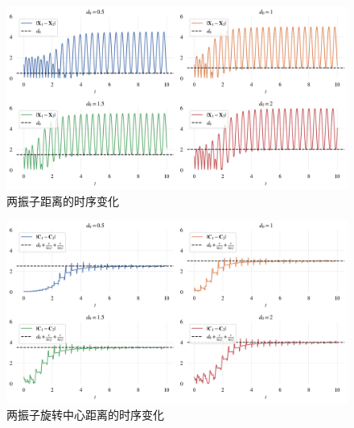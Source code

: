 \documentclass{article}
\begin{document}
\begin{figure}[H]
	\centering
	\includegraphics[width=\textwidth]{./figs/2particalDis.png}
	\vspace{-0.5cm}
	\caption{两振子距离的时序变化}
	\label{fig:fig2.6.dis}
\end{figure}

\begin{figure}[H]
	\centering
	\includegraphics[width=\textwidth]{./figs/2particalCentersDis.png}
	\vspace{-0.5cm}
	\caption{两振子旋转中心距离的时序变化}
	\label{fig:fig2.6.centerDis}
\end{figure}
\end{document}
